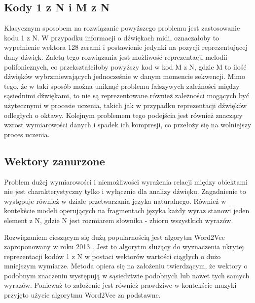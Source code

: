 {{        \subsection{Kody 1 z N i M z N}
        {
            Klasycznym sposobem na rozwiązanie powyższego problemu jest zastosowanie kodu 1 z\,\,N. W\,\,przypadku
            informacji o\,\,dźwiękach midi, oznaczałoby to wypełnienie wektora 128 zerami i\,\,postawienie jedynki na 
            pozycji reprezentującej dany dźwięk. 
            Zaletą tego rozwiązania jest możliwość reprezentacji melodii polifonicznych, co przekształciłoby
            powyższy kod w\,\,kod M\,\,z N, gdzie M\,\,to ilość dźwięków wybrzmiewających jednocześnie w\,\,danym momencie sekwencji.
            Mimo tego, że w\,\,taki sposób można uniknąć problemu fałszywych zależności między sąsiednimi dźwiękami, 
            to nie są reprezentowane również zależności mogących być użytecznymi w\,\,procesie uczenia, 
            takich jak w\,\,przypadku reprezentacji dźwięków odległych o\,\,oktawy. 
            Kolejnym problemem tego podejścia jest również znaczący wzrost wymiarowości danych i\,\,spadek ich kompresji,
            co przełoży się na wolniejszy proces uczenia.
        }

        \subsection{Wektory zanurzone}
        {
            Problem dużej wymiarowości i\,\,niemożliwości wyrażenia relacji między obiektami nie jest
            charakterystyczny tylko i\,\,wyłącznie dla analizy dźwięku. Zagadnienie to  występuje również w\,\,dziale
            przetwarzania języka naturalnego. Również w\,\,kontekście modeli operujących na fragmentach języka każdy wyraz stanowi
            jeden element z\,\,N, gdzie N\,\,jest rozmiarem słownika - zbioru wszystkich wyrazów.

            Rozwiązaniem cieszącym się dużą popularnością jest algorytm Word2Vec zaproponowany w\,\,roku 2013 \cite{Mikolov2013EfficientEO}.
            Jest to algorytm służący do wyznaczenia ukrytej reprezentacji kodów 1 z\,\,N w\,\,postaci wektorów wartości ciągłych
            o\,\,dużo mniejszym wymiarze. Metoda opiera się na założeniu twierdzącym, że wektory 
            o\,\,podobnym znaczeniu występują w\,\,sąsiedztwie podobnych lub nawet tych samych wyrazów. Ponieważ to założenie 
            jest również prawdziwe w\,\,kontekście muzyki przyjęto użycie algorytmu Word2Vec za podstawne.
            
}}}
